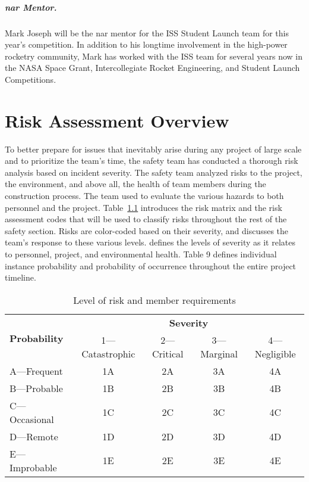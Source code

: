 \paragraph{\gls{nar} Mentor.}

Mark Joseph will be the \gls{nar} mentor for the ISS Student Launch team for this year's competition. In addition to his longtime involvement in the high-power rocketry community, Mark has worked with the ISS team for several years now in the NASA Space Grant, Intercollegiate Rocket Engineering, and Student Launch Competitions.

\chapter{Risk Assessment Overview}

To better prepare for issues that inevitably arise during any project of large scale and to prioritize the team's time, the safety team has conducted a thorough risk analysis based on incident severity. The safety team analyzed risks to the project, the environment, and above all, the health of team members during the construction process. The team used  to evaluate the various hazards to both personnel and the project. Table~\ref{tab:level of risk and member requirements} introduces the risk matrix and the risk assessment codes that will be used to classify risks throughout the rest of the safety section. Risks are color-coded based on their severity, and  discusses the team's response to these various levels.  defines the levels of severity as it relates to personnel, project, and environmental health. Table 9 defines individual instance probability and probability of occurrence throughout the entire project timeline.

\begin{table}[H]
    \centering
    \caption{Level of risk and member requirements}
    \label{tab:level of risk and member requirements}
    \begin{tabularx}{0.8\linewidth}{X c c c c}
        \toprule
       \multirow{2}{*}{\textbf{Probability}} & \multicolumn{4}{c}{\textbf{Severity}} \\
       \cmidrule(l){2-5}
        & 1---Catastrophic & 2---Critical & 3---Marginal & 4---Negligible \\
       \midrule
       A---Frequent & \cellcolor{red!25} 1A & \cellcolor{red!25} 2A & \cellcolor{orange!25} 3A & \cellcolor{green!25} 4A \\
       B---Probable & \cellcolor{red!25} 1B & \cellcolor{red!25} 2B & \cellcolor{orange!25} 3B & \cellcolor{green!25} 4B \\
       C---Occasional & \cellcolor{red!25} 1C & \cellcolor{orange!25} 2C & \cellcolor{orange!25} 3C & 4C \\
       D---Remote & \cellcolor{orange!25} 1D & \cellcolor{orange!25} 2D & \cellcolor{green!25} 3D & 4D \\
       E---Improbable & \cellcolor{green!25} 1E & \cellcolor{green!25} 2E & \cellcolor{green!25} 3E & 4E \\
       \bottomrule
    \end{tabularx}
\end{table}

